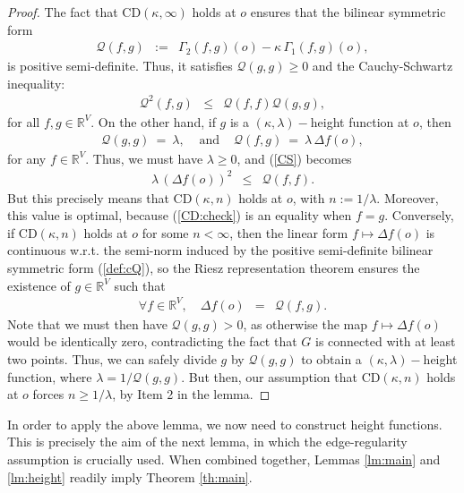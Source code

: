 \documentclass[12pt,final]{article}
\newcommand{\cQ}{\mathcal {Q}}
\newcommand{\dR}{\mathbb {R}}
\newcommand{\CD}{\mathrm{CD}}
\begin{document}
\begin{proof}
The fact that $\CD(\kappa,\infty)$ holds at $o$ ensures that the bilinear symmetric form
\begin{eqnarray}
\label{def:cQ}
\cQ(f,g) & := & \Gamma_2(f,g)(o)-\kappa\,\Gamma_1(f,g)(o),
\end{eqnarray}
is positive semi-definite. Thus, it satisfies $\cQ(g,g)\ge 0$ and the Cauchy-Schwartz inequality:
\begin{eqnarray}
\label{CS}
\cQ^2(f,g) & \le & \cQ(f,f)\cQ(g,g),
\end{eqnarray}
for all $f,g\in \dR^V$. On the other hand, if $g$ is a $(\kappa,\lambda)-$height function at $o$, then
\begin{eqnarray*}
\cQ(g,g) \ = \ \lambda, & \textrm{ and } & \cQ(f,g) \ = \ \lambda\,\Delta f(o),
\end{eqnarray*}
for any $f\in \dR^V$. Thus, we must have $\lambda\ge 0$, and (\ref{CS}) becomes
\begin{eqnarray}
\label{CD:check}
\lambda\, \left(\Delta f(o)\right)^2 & \le & \cQ(f,f).
\end{eqnarray}
But this precisely means that $\CD(\kappa,n)$ holds at $o$, with $n:=1/\lambda$. Moreover, this value is optimal, because (\ref{CD:check}) is an equality when $f=g$. Conversely, if $\CD(\kappa,n)$ holds at $o$ for some $n<\infty$, then the linear form $f\mapsto \Delta f(o)$ is continuous w.r.t. the semi-norm induced by the positive semi-definite  bilinear symmetric form (\ref{def:cQ}), so the Riesz representation theorem ensures the existence of $g\in\dR^V$ such that 
\begin{eqnarray}
\forall f\in\dR^V,\quad \Delta f(o) & = & \cQ(f,g).
\end{eqnarray}
Note that we must then have $\cQ(g,g)>0$, as otherwise the map $f\mapsto \Delta f(o)$  would be identically zero, contradicting the fact that $G$ is connected  with at least two points. Thus, we can safely divide $g$ by $\cQ(g,g)$ to obtain a $(\kappa,\lambda)-$height function, where $\lambda=1/\cQ(g,g)$. But then, our assumption that  $\CD(\kappa,n)$ holds at $o$ forces $n\ge 1/\lambda$, by Item 2 in the lemma.
\end{proof}

In order to apply the above lemma, we now need to construct height functions. This is precisely the aim of the next lemma, in which the edge-regularity assumption is crucially used. 
When combined together, Lemmas \ref{lm:main} and \ref{lm:height} readily imply Theorem \ref{th:main}.   
\end{document}
